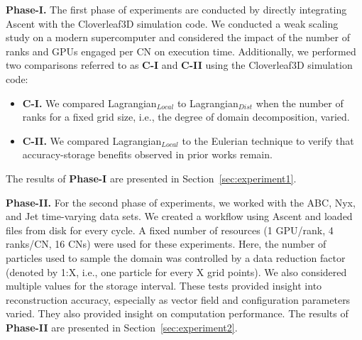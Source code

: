 %
\textbf{Phase-I.} The first phase of experiments are conducted by directly integrating Ascent with the Cloverleaf3D simulation code. 
%
We conducted a weak scaling study on a modern supercomputer and considered the impact of the number of ranks and GPUs engaged per CN on execution time. 
%
Additionally, we performed two comparisons referred to as \textbf{C-I} and \textbf{C-II} using the Cloverleaf3D simulation code: 
%
\begin{itemize}[leftmargin=*]
\item\textbf{C-I.} We compared Lagrangian$_{Local}$ to Lagrangian$_{Dist}$ when the number of ranks for a fixed grid size, i.e., the degree of domain decomposition, varied.
%
\item\textbf{C-II.} We compared Lagrangian$_{Local}$ to the Eulerian technique to verify that accuracy-storage benefits observed in prior works remain. 
\end{itemize}
%
The results of \textbf{Phase-I} are presented in Section~\ref{sec:experiment1}.

\textbf{Phase-II.} For the second phase of experiments, we worked with the ABC, Nyx, and Jet time-varying data sets.
%
We created a workflow using Ascent and loaded files from disk for every cycle.
%
A fixed number of resources (1 GPU/rank, 4 ranks/CN, 16 CNs) were used for these experiments.
%
Here, the number of particles used to sample the domain was controlled by a data reduction factor (denoted by 1:X, i.e., one particle for every X grid points). 
%
%
We also considered multiple values for the storage interval. 
%
These tests provided insight into reconstruction accuracy, especially as vector field and configuration parameters varied. 
%
They also provided insight on computation performance.
%
The results of \textbf{Phase-II} are presented in Section~\ref{sec:experiment2}.

%

